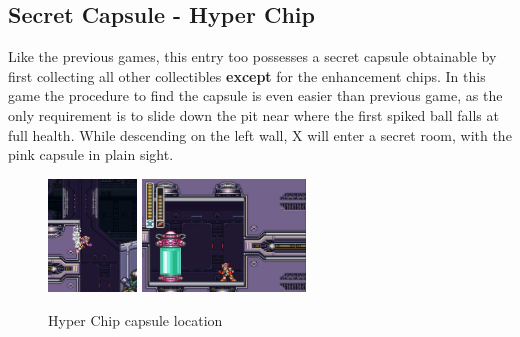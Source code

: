 \subsection{Secret Capsule - Hyper Chip}
Like the previous games, this entry too possesses a secret capsule obtainable by first collecting all other collectibles \textbf{except} for the enhancement chips. In this game the procedure to find the capsule is even easier than previous game, as the only requirement is to slide down the pit near where the first spiked ball falls at full health. While descending on the left wall, X will enter a secret room, with the pink capsule in plain sight.

\begin{figure}[htp]
	\centering
	\includegraphics[height=3cm]{figures/X3/Doppler_stages/Hyper_chip_1.png}
	\includegraphics[height=3cm]{figures/X3/Doppler_stages/Hyper_chip.png}
	\caption{Hyper Chip capsule location}
\end{figure}


